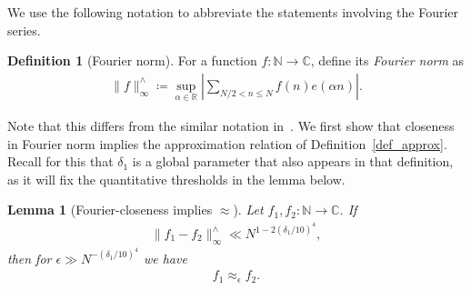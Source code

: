 \documentclass[12pt]{amsart}
\newtheorem{lemma}[theorem]{Lemma}
\theoremstyle{definition}
\newtheorem{definition}[theorem]{Definition}
\theoremstyle{remark}
\numberwithin{equation}{section}
\newcommand{\1}{\mathbf{1}}
\newcommand{\N}{{\mathbb N}}
\begin{document}
We use the following notation to abbreviate the statements involving the Fourier series. 
\begin{definition}[Fourier norm]\label{def:Fouriernorm}
    For a function $f:\mathbb{N}\to \mathbb{C}$, define its \emph{Fourier norm} as
    \begin{align*}
        \|f\|_{\infty}^{\wedge}\coloneqq \sup_{\alpha \in \mathbb{R}}\left|\sum_{N/2< n\leq N}f(n)e(\alpha n)\right|.    
    \end{align*}
\end{definition}
Note that this differs from the similar notation in~\cite[Section 8.1]{green-sarkozy}. We first show that closeness in Fourier norm implies the approximation relation of Definition~\ref{def_approx}. Recall for this that $\delta_1$ is a global parameter that also appears in that definition, as it will fix the quantitative thresholds in the lemma below.
\begin{lemma}[Fourier-closeness implies $\approx$]\label{lem_fourierimpliesapprox}
    Let $f_1,f_2:\N\to \mathbb{C}$. If
	\begin{align*}
		\|f_1-f_2\|_{\infty}^{\wedge} \ll N^{1-2(\delta_1/10)^{4}},
    \end{align*}
	then for $\epsilon\gg N^{-(\delta_1/10)^{4}}$ we have
    \begin{align*}
        f_1\approx_{\epsilon} f_2.
	\end{align*}
	\end{lemma}
\end{document}

